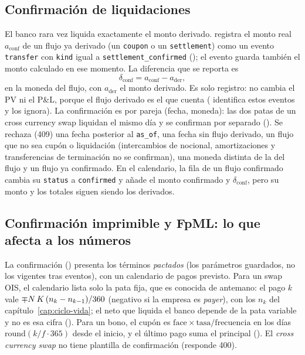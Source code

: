 \subsection{Confirmación de liquidaciones}\label{sec:cap11-confirmacion-liq}

El banco rara vez liquida exactamente el monto derivado.  registra el monto real $a_{\mathrm{conf}}$ de un flujo ya derivado (un \texttt{coupon} o un \texttt{settlement}) como un evento \texttt{transfer} con \texttt{kind} igual a \texttt{settlement\_confirmed} (); el evento guarda también el monto calculado en ese momento. La diferencia que se reporta es
\begin{equation}\label{eq:cap11-dif-conf}
  \delta_{\mathrm{conf}} = a_{\mathrm{conf}} - a_{\mathrm{der}},
\end{equation}
en la moneda del flujo, con $a_{\mathrm{der}}$ el monto derivado. Es solo registro: no cambia el PV ni el P\&L, porque el flujo derivado es el que cuenta ( identifica estos eventos y  los ignora). La confirmación es por pareja (fecha, moneda): las dos patas de un cross currency swap liquidan el mismo día y se confirman por separado (). Se rechaza (409) una fecha posterior al \texttt{as\_of}, una fecha sin flujo derivado, un flujo que no sea cupón o liquidación (intercambios de nocional, amortizaciones y transferencias de terminación no se confirman), una moneda distinta de la del flujo y un flujo ya confirmado. En el calendario, la fila de un flujo confirmado cambia su \texttt{status} a \texttt{confirmed} y añade el monto confirmado y $\delta_{\mathrm{conf}}$, pero su monto y los totales siguen siendo los derivados.

\subsection{Confirmación imprimible y FpML: lo que afecta a los números}\label{sec:cap11-fpml}

La confirmación () presenta los términos \emph{pactados} (los parámetros guardados, no los vigentes tras eventos), con un calendario de pagos previsto. Para un swap OIS, el calendario lista solo la pata fija, que es conocida de antemano: el pago $k$ vale $\mp N\,K\,(n_k - n_{k-1})/360$ (negativo si la empresa es \emph{payer}), con los $n_k$ del capítulo~\ref{cap:ciclo-vida}; el neto que liquida el banco depende de la pata variable y no es esa cifra (). Para un bono, el cupón es $\text{face}\times\text{tasa}/\text{frecuencia}$ en los días $\mathrm{round}(k/f\cdot 365)$ desde el inicio, y el último pago suma el principal (). El \emph{cross currency swap} no tiene plantilla de confirmación (responde 400).

